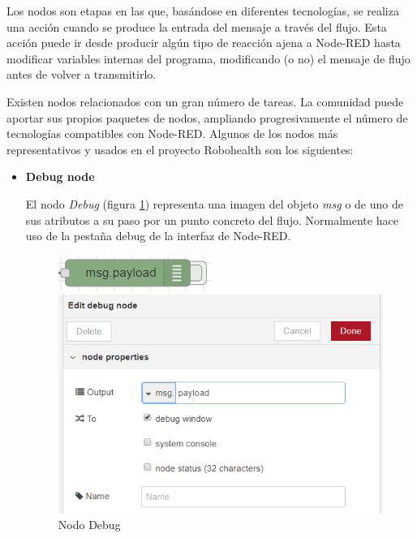 Los nodos son etapas en las que, basándose en diferentes tecnologías, se realiza una acción cuando se produce la entrada del mensaje a través del flujo. Esta acción puede ir desde producir algún tipo de reacción ajena a Node-RED hasta modificar variables internas del programa, modificando (o no) el mensaje de flujo antes de volver a transmitirlo.

Existen nodos relacionados con un gran número de tareas. La comunidad puede aportar sus propios paquetes de nodos, ampliando progresivamente el número de tecnologías compatibles con Node-RED. Algunos de los nodos más representativos y usados en el proyecto Robohealth son los siguientes:

\begin{itemize}
\item \textbf{Debug node}

El nodo \textit{Debug} (figura \ref{fig:nodedebug}) representa una imagen del objeto \textit{msg} o de uno de sus atributos a su paso por un punto concreto del flujo. Normalmente hace uso de la pestaña debug de la interfaz de Node-RED.

\begin{figure}[H]
  \centering
  \begin{minipage}[b]{0.3\textwidth}
    \includegraphics[width=\textwidth]{figuras/debugNode.png}
  \end{minipage}
  \hfill
  \begin{minipage}[b]{0.5\textwidth}
    \includegraphics[width=\textwidth]{figuras/debugNodeProp.png}
  \end{minipage}
  \caption{Nodo Debug}\label{fig:nodedebug}
\end{figure}


\end{itemize}
